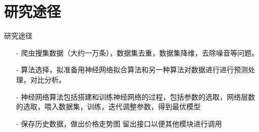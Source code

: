 \documentclass{ctexbeamer}
\begin{document}
    \section{研究途径}
    \begin{frame}{研究途径}
        \begin{itemize}
            \item[-] 爬虫搜集数据（大约一万条），数据集去重，数据集降维，去除噪音等问题。 
            \item[-] 算法选择，拟准备用神经网络拟合算法和另一种算法对数据进行进行预测处理，对比分析。 
            \item[-] 神经网络算法包括搭建和训练神经网络的过程，包括参数的选取，网络层数的选取，喂入数据集，训练，迭代调整参数，得到最优模型 
            \item[-] 保存历史数据，做出价格走势图 
            留出接口以便其他模块进行调用              
        \end{itemize}
    \end{frame}
\end{document}
